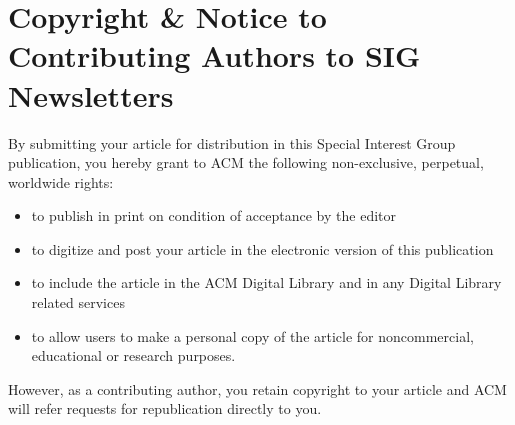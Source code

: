 \documentclass[letterpaper]{article}
\begin{document}
\section{Copyright \& Notice to Contributing Authors to SIG Newsletters}
By submitting your article for distribution in this Special Interest Group publication, you hereby grant to ACM the following non-exclusive, perpetual, worldwide rights:
\begin{itemize}
\item to publish in print on condition of acceptance by the editor
\item to digitize and post your article in the electronic version of this publication
\item to include the article in the ACM Digital Library and in any Digital Library related services 
\item to allow users to make a personal copy of the article for noncommercial, educational or research purposes.
\end{itemize}
However, as a contributing author, you retain copyright to your article and ACM will refer requests for republication directly to you.
\end{document}
